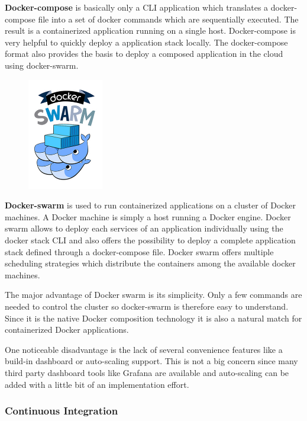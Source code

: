 \textbf{Docker-compose} is basically only a CLI application which translates a
docker-compose file into a set of docker commands which are sequentially
executed. The result is a containerized application running on a single
host. Docker-compose is very helpful to quickly deploy a \ms{} application
stack locally. The docker-compose format also provides the basis to deploy a
composed application in the cloud using docker-swarm.\\

\begin{figure}
	\hspace*{0.4cm}
    \includegraphics[width=3.3cm]{images/dependencies/docker-swarm}
\end{figure}

\noindent\textbf{Docker-swarm} is used to run containerized applications on a
cluster of Docker machines. A Docker machine is simply a host running a Docker
engine. Docker swarm allows to deploy each services of an application
individually using the docker stack CLI and also offers the possibility to
deploy a complete application stack defined through a docker-compose file.
Docker swarm offers multiple scheduling strategies which distribute the
containers among the available docker machines.

The major advantage of Docker swarm is its simplicity. Only a few commands are
needed to control the cluster so docker-swarm is therefore easy to understand.
Since it is the native Docker composition technology it is also a natural match
for containerized Docker applications.

One noticeable disadvantage is the lack of several convenience features like a
build-in dashboard or auto-scaling support. This is not a big concern since many
third party dashboard tools like Grafana are available and auto-scaling can be
added with a little bit of an implementation effort.

\subsubsection{Continuous Integration}

